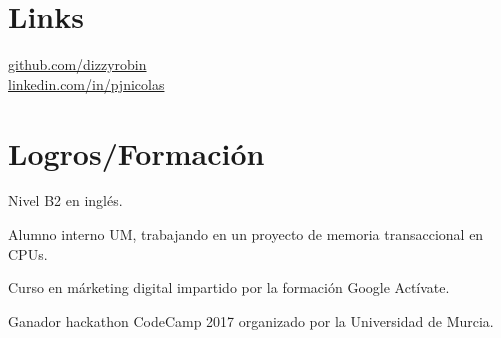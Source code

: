 \documentclass[letterpaper]{deedy-resume} %
\begin{document}
\begin{minipage}[t]{0.33\textwidth}
\sectionspace


\section{Links}

\href{https://github.com/dizzyrobin}{github.com/dizzyrobin} \\
\href{https://www.linkedin.com/in/pjnicolas}{linkedin.com/in/pjnicolas} \\


\sectionspace


\section{Logros/Formación}


Nivel B2 en inglés.\\
\vspace{0.1cm}

Alumno interno UM, trabajando en un proyecto de memoria transaccional en CPUs.\\
\vspace{0.1cm}

Curso en márketing digital impartido por la formación Google Actívate.\\
\vspace{0.1cm}

Ganador hackathon CodeCamp 2017 organizado por la Universidad de Murcia.\\

\sectionspace



\end{minipage}
\end{document}
